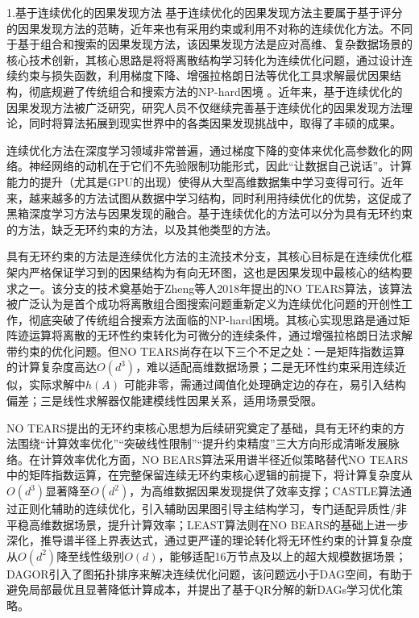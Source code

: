 {\hei 1.基于连续优化的因果发现方法}
基于连续优化的因果发现方法主要属于基于评分的因果发现方法的范畴，近年来也有采用约束或利用不对称的连续优化方法。不同于基于组合和搜索的因果发现方法，该因果发现方法是应对高维、复杂数据场景的核心技术创新，其核心思路是将将离散结构学习转化为连续优化问题，通过设计连续约束与损失函数，利用梯度下降、增强拉格朗日法等优化工具求解最优因果结构，彻底规避了传统组合和搜索方法的NP-hard困境\cite{李家宁2023} 。近年来，基于连续优化的因果发现方法被广泛研究，研究人员不仅继续完善基于连续优化的因果发现方法理论，同时将算法拓展到现实世界中的各类因果发现挑战中，取得了丰硕的成果。

连续优化方法在深度学习领域非常普遍，通过梯度下降的变体来优化高参数化的网络。神经网络的动机在于它们不先验限制功能形式，因此“让数据自己说话”\cite{VanderLaan2011}。计算能力的提升（尤其是GPU的出现）使得从大型高维数据集中学习变得可行。近年来，越来越多的方法试图从数据中学习结构，同时利用持续优化的优势，这促成了黑箱深度学习方法与因果发现的融合。基于连续优化的方法可以分为具有无环约束的方法，缺乏无环约束的方法，以及其他类型的方法。

具有无环约束的方法是连续优化方法的主流技术分支，其核心目标是在连续优化框架内严格保证学习到的因果结构为有向无环图，这也是因果发现中最核心的结构要求之一。该分支的技术奠基始于Zheng等人2018年提出的NO TEARS算法\cite{Zheng2018}，该算法被广泛认为是首个成功将离散组合图搜索问题重新定义为连续优化问题的开创性工作，彻底突破了传统组合搜索方法面临的NP-hard困境。其核心实现思路是通过矩阵迹运算将离散的无环性约束转化为可微分的连续条件，通过增强拉格朗日法求解带约束的优化问题。但NO TEARS尚存在以下三个不足之处：一是矩阵指数运算的计算复杂度高达$O(d^3)$，难以适配高维数据场景；二是无环性约束采用连续近似，实际求解中$h(A)$
可能非零，需通过阈值化处理确定边的存在，易引入结构偏差；三是线性求解器仅能建模线性因果关系，适用场景受限。

NO TEARS提出的无环约束核心思想为后续研究奠定了基础，具有无环约束的方法围绕“计算效率优化”“突破线性限制”“提升约束精度”三大方向形成清晰发展脉络。在计算效率优化方面，NO BEARS算法\cite{Lee2019}采用谱半径近似策略替代NO TEARS中的矩阵指数运算，在完整保留连续无环约束核心逻辑的前提下，将计算复杂度从$O(d^3)$显著降至$O(d^2)$，为高维数据因果发现提供了效率支撑；CASTLE算法\cite{Kyono2020}通过正则化辅助的连续优化，引入辅助因果图引导主结构学习，专门适配异质性/非平稳高维数据场景，提升计算效率；LEAST算法\cite{Zhu2021}则在NO BEARS的基础上进一步深化，推导谱半径上界表达式，通过更严谨的理论转化将无环性约束的计算复杂度从$O(d^2)$降至线性级别$O(d)$，能够适配16万节点及以上的超大规模数据场景；DAGOR\cite{Zuo2024}引入了图拓扑排序来解决连续优化问题，该问题远小于DAG空间，有助于避免局部最优且显著降低计算成本，并提出了基于QR分解的新DAGs学习优化策略。

